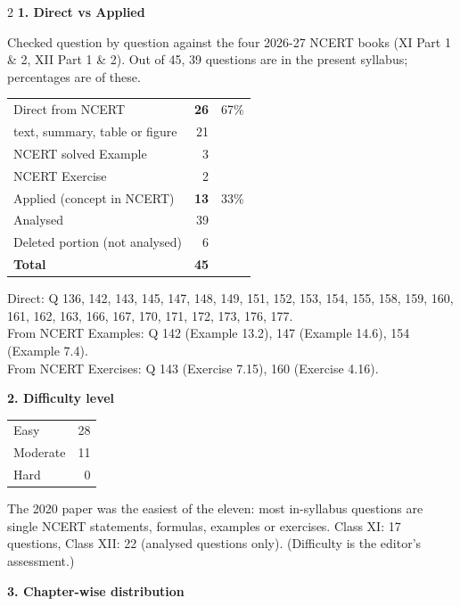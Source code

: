 \vspace{4pt}
\begin{multicols}{2}
\textbf{\color{crimson}1. Direct vs Applied}\par\smallskip
{\footnotesize Checked question by question against the four 2026-27 NCERT books (XI Part 1 \& 2, XII Part 1 \& 2). Out of 45, 39 questions are in the present syllabus; percentages are of these.}\par\smallskip
\begin{tabular}{@{}lrr@{}}\toprule
Direct from NCERT & \textbf{26} & 67\%\\
\quad text, summary, table or figure & 21 &\\
\quad NCERT solved Example & 3 &\\
\quad NCERT Exercise & 2 &\\
Applied (concept in NCERT) & \textbf{13} & 33\%\\\midrule
Analysed & 39 &\\
Deleted portion (not analysed) & 6 &\\\midrule
\textbf{Total} & \textbf{45} &\\\bottomrule\end{tabular}\par\smallskip
{\footnotesize Direct: Q 136, 142, 143, 145, 147, 148, 149, 151, 152, 153, 154, 155, 158, 159, 160, 161, 162, 163, 166, 167, 170, 171, 172, 173, 176, 177.\\ From NCERT Examples: Q 142 (Example 13.2), 147 (Example 14.6), 154 (Example 7.4).\\ From NCERT Exercises: Q 143 (Exercise 7.15), 160 (Exercise 4.16).}\par\medskip
\textbf{\color{crimson}2. Difficulty level}\par\smallskip
\begin{tabular}{@{}lr@{}}\toprule
Easy & 28\\ Moderate & 11\\ Hard & 0\\\bottomrule\end{tabular}\par\smallskip
{\footnotesize The 2020 paper was the easiest of the eleven: most in-syllabus questions are single NCERT statements, formulas, examples or exercises. Class XI: 17 questions, Class XII: 22 (analysed questions only). (Difficulty is the editor's assessment.)}\par\medskip
\columnbreak
\textbf{\color{crimson}3. Chapter-wise distribution}\par\smallskip

\end{multicols}
